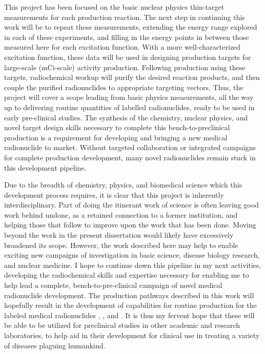 This project has been focused on  the basic nuclear physics thin-target measurements for each production reaction.
The next step in continuing this work will be to repeat these measurements, extending the energy range explored in each of these experiments, and filling in the energy points in between those measured here for each excitation function. 
With a more well-characterized excitation function, these data  will be used in designing production targets for large-scale (mCi-scale) activity production. 
Following production using these targets, radiochemical workup will purify the desired reaction products, and then couple the purified radionuclides to appropriate targeting vectors. 
Thus, the project will cover a scope leading from basic physics measurements, all the way up to delivering routine quantities of labelled radionuclides, ready to be used in early pre-clinical studies. 
The synthesis of the chemistry, nuclear physics, and novel target design skills necessary to complete this bench-to-preclinical production is a requirement for developing and bringing a new medical radionuclide to market.
Without targeted collaboration or integrated campaigns for complete production development, many novel radionuclides remain stuck in this development pipeline.



Due to the breadth of chemistry, physics, and biomedical science which this development process requires, it is clear that this project is inherently interdisciplinary.
Part of doing the itinerant work of science is often leaving good work behind undone, as a retained connection to a former institution, and helping those that follow  to improve upon the work that has been done. 
Moving beyond the  work in the present dissertation would likely have excessively broadened its scope.
However, the work described here may help to enable exciting new campaigns of investigation in basic science, disease biology research, and nuclear medicine.
I hope to continue down this pipeline in my next activities, developing the radiochemical skills and expertise necessary for enabling me to help lead a complete, bench-to-pre-clinical campaign of novel medical radionuclide development.
The production pathways described in this work  will hopefully result in the development of capabilities for routine production for the labeled medical radionuclides  ,   , and . 
It is thus my fervent hope that these will be able to be utilized for preclinical studies in other  academic and research laboratories, to help aid in their development for clinical use in treating a variety of diseases plaguing humankind. 

